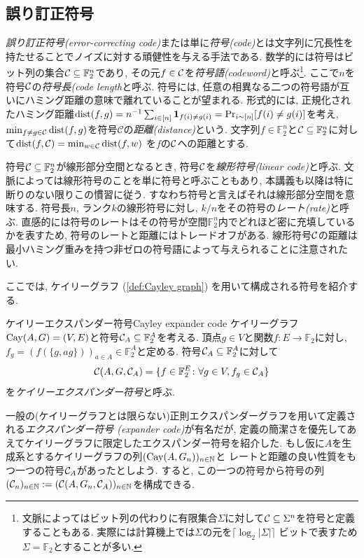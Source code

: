 \subsection{誤り訂正符号} \label{sec:error correcting code}
\emph{誤り訂正符号(error-correcting code)}または単に\emph{符号(code)}とは文字列に冗長性を持たせることでノイズに対する頑健性を与える手法である.
数学的には符号はビット列の集合$\mathcal{C}\subseteq\mathbb{F}_2^n$であり, その元$f\in\mathcal{C}$を\emph{符号語(codeword)}と呼ぶ\footnote{文脈によってはビット列の代わりに有限集合$\Sigma$に対して$\mathcal{C}\subseteq\Sigma^n$を符号と定義することもある. 実際には計算機上では$\Sigma$の元を$\lceil\log_2 |\Sigma|\rceil$ ビットで表すため$\Sigma=\mathbb{F}_2$とすることが多い.}.
ここで$n$を符号$\mathcal{C}$の\emph{符号長(code length}と呼ぶ.
符号には, 任意の相異なる二つの符号語が互いにハミング距離の意味で離れていることが望まれる.
形式的には, 正規化されたハミング距離$\mathrm{dist}(f,g)=n^{-1}\sum_{i\in[n]}\mathbf{1}_{f(i)\neq g(i)}=\Pr_{i\sim[n]}[f(i)\neq g(i)]$を考え, $\min_{f\neq g\in\mathcal{C}}\mathrm{dist}(f,g)$を符号$\mathcal{C}$の\emph{距離(distance)}という.
文字列$f\in\mathbb{F}_2^n$と$\mathcal{C}\subseteq\mathbb{F}_2^n$に対して$\mathrm{dist}(f,\mathcal{C})=\min_{w\in\mathcal{C}}\mathrm{dist}(f,w)$
を$f$の$\mathcal{C}$への距離とする.


符号$\mathcal{C}\subseteq\mathbb{F}_2^n$が線形部分空間となるとき, 符号$\mathcal{C}$を\emph{線形符号(linear code)}と呼ぶ.
文脈によっては線形符号のことを単に符号と呼ぶこともあり,
本講義も以降は特に断りのない限りこの慣習に従う.
すなわち符号と言えばそれは線形部分空間を意味する.
符号長$n$, ランク$k$の線形符号に対し,
$k/n$をその符号の\emph{レート(rate)}と呼ぶ.
直感的には符号のレートはその符号が空間$\mathbb{F}_2^n$内でどれほど密に充填しているかを表すため,
符号のレートと距離にはトレードオフがある.
線形符号$\mathcal{C}$の距離は最小ハミング重みを持つ非ゼロの符号語によって与えられることに注意されたい.

ここでは, ケイリーグラフ (\cref{def:Cayley graph}) を用いて構成される符号を紹介する.
\begin{definition}{ケイリーエクスパンダー符号}{Cayley expander code}
    ケイリーグラフ$\mathrm{Cay}(A,G)=(V,E)$と符号$\mathcal{C}_A\subseteq\mathbb{F}_2^A$を考える.
    頂点$g\in V$と関数$f\colon E \to \mathbb{F}_2$に対し, $f_g=(f(\{g,ag\}))_{a\in A}\in \mathbb{F}_2^A$と定める.
    符号$\mathcal{C}_A\subseteq \mathbb{F}_2^A$に対して
    \begin{align*}
        \mathcal{C}(A,G,\mathcal{C}_A)=\{f\in\mathbb{F}_2^E\colon \forall g\in V, f_g \in \mathcal{C}_A\}
    \end{align*}
    を\emph{ケイリーエクスパンダー符号}と呼ぶ.
\end{definition}
一般の(ケイリーグラフとは限らない)正則エクスパンダーグラフを用いて定義される\emph{エクスパンダー符号 (expander code)}が有名だが, 定義の簡潔さを優先してあえてケイリーグラフに限定したエクスパンダー符号を紹介した.
もし仮に$A$を生成系とするケイリーグラフの列$(\mathrm{Cay}(A,G_n))_{n\in\mathbb{N}}$と
レートと距離の良い性質をもつ一つの符号$\mathcal{C}_A$があったとしよう.
すると, この一つの符号から符号の列$(\mathcal{C}_n)_{n\in\mathbb{N}} \mathrel{:=} (\mathcal{C}(A,G_n,\mathcal{C}_A))_{n\in\mathbb{N}}$を構成できる.

